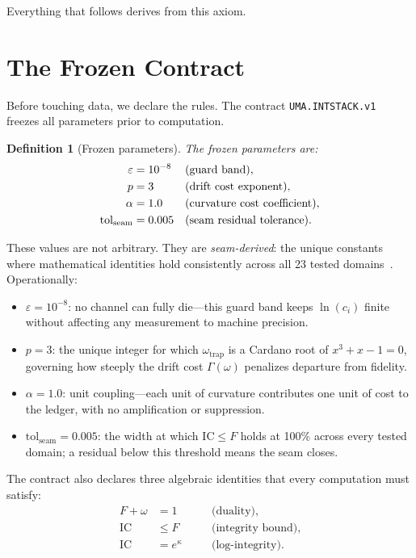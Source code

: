 \documentclass[
  aps,
  prd,
  twocolumn,
  superscriptaddress,
  nofootinbib,
  floatfix
]{revtex4-2}
\newtheorem{definition}[theorem]{Definition}
\newcommand{\Gam}{\Gamma}
\newcommand{\eps}{\varepsilon}
\newcommand{\tolseam}{\mathrm{tol}_{\mathrm{seam}}}
\newcommand{\IC}{\mathrm{IC}}
\begin{document}
Everything that follows derives from this axiom.

\section{The Frozen Contract}\label{sec:contract}

Before touching data, we declare the rules.  The contract
\texttt{UMA.INTSTACK.v1}~\cite{paulus2026umcpcasepack} freezes all
parameters prior to computation.

\begin{definition}[Frozen parameters]\label{def:frozen}
The frozen parameters are:
\begin{align}
  \eps &= 10^{-8} & &\text{(guard band)}, \notag \\
  p &= 3 & &\text{(drift cost exponent)}, \notag \\
  \alpha &= 1.0 & &\text{(curvature cost coefficient)}, \notag \\
  \tolseam &= 0.005 & &\text{(seam residual tolerance)}. \notag
\end{align}
\end{definition}

These values are not arbitrary.  They are \emph{seam-derived}: the
unique constants where mathematical identities hold consistently
across all 23 tested
domains~\cite{paulus2025physicscoherence,umcpmetadatarepo}.
Operationally:
\begin{itemize}[leftmargin=*,nosep]
  \item $\eps = 10^{-8}$: no channel can fully die---this guard band
    keeps $\ln(c_i)$ finite without affecting any measurement to
    machine precision.
  \item $p = 3$: the unique integer for which
    $\omega_{\mathrm{trap}}$ is a Cardano root of $x^3 + x - 1 = 0$,
    governing how steeply the drift cost $\Gam(\omega)$ penalizes
    departure from fidelity.
  \item $\alpha = 1.0$: unit coupling---each unit of curvature
    contributes one unit of cost to the ledger, with no amplification
    or suppression.
  \item $\tolseam = 0.005$: the width at which $\IC \leq F$ holds at
    100\% across every tested domain; a residual below this threshold
    means the seam closes.
\end{itemize}

The contract also declares three algebraic identities that every
computation must satisfy:
\begin{align}
  F + \omega &= 1 \quad &&\text{(duality),} \label{eq:duality} \\
  \IC &\leq F \quad &&\text{(integrity bound),} \label{eq:bound} \\
  \IC &= e^\kappa \quad &&\text{(log-integrity).} \label{eq:logint}
\end{align}
\end{document}
